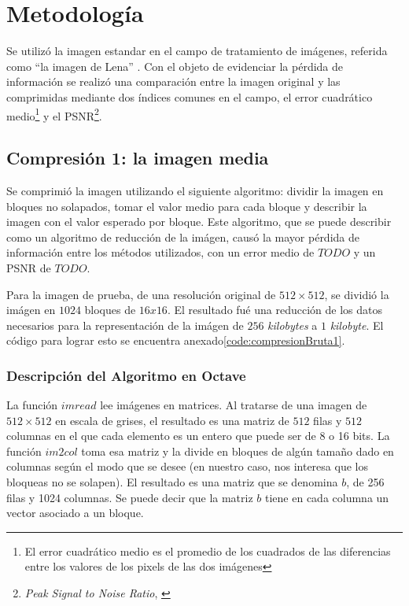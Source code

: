 \documentclass[twocolumn,a4paper,10pt]{article}
\begin{document}

\section{Metodología}

Se utiliz\'o la imagen estandar en el campo de tratamiento de im\'agenes, referida como ``la imagen de Lena'' \cite{lena} \cite{lenaweb}. Con el objeto de evidenciar la pérdida de información se realizó una comparación entre la imagen original y las comprimidas mediante dos índices comunes en el campo, el error cuadrático medio\footnote{El error cuadrático medio es el promedio de los cuadrados de las diferencias entre los valores de los pixels de las dos imágenes} y el PSNR\footnote{\textit{Peak Signal to Noise Ratio}, \cite{PSNR}}.

\subsection{Compresi\'on 1: la imagen media}
\label{sec:compresion1}

Se comprimió la imagen utilizando el siguiente algoritmo: dividir la imagen en bloques no solapados, tomar el valor medio para cada bloque y describir la imagen con el valor esperado por bloque. Este algoritmo, que se puede describir como un algoritmo de reducción de la imágen, causó la mayor pérdida de información entre los métodos utilizados, con un error medio de $TODO$ y un PSNR de $TODO$.

Para la imagen de prueba, de una resolución original de $512 \times 512$, se dividió la imágen en $1024$ bloques de $16x16$. El resultado fué una reducción de los datos necesarios para la representación de la imágen de $256$ \textit{kilobytes} a $1$ \textit{kilobyte}. El código para lograr esto se encuentra anexado\ref{code:compresionBruta1}.

\subsubsection{Descripción del Algoritmo en Octave}

La funci\'on $imread$ lee im\'agenes en matrices. Al tratarse de una imagen de $512 \times 512$ en escala de grises, el resultado es una matriz de $512$ filas y $512$ columnas en el que cada elemento es un entero que puede ser de 8 o 16 bits. La funci\'on $im2col$ toma esa matriz y la divide en bloques de alg\'un tamaño dado en columnas seg\'un el modo que se desee (en nuestro caso, nos interesa que los bloqueas no se solapen). El resultado es una matriz que se denomina $b$, de 256 filas y 1024 columnas. Se puede decir que la matriz $b$ tiene en cada columna un vector asociado a un bloque. 
\end{document}
